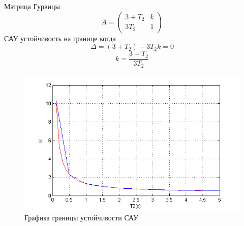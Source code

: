 \documentclass[a4paper, 11pt] {article}
\begin{document}
Матрица Гурвицы %
\[A = \left( {\begin{array}{*{20}{c}}
	{3 + {T_2}}&k\\
	{3{T_2}}&1
	\end{array}} \right)\]
САУ устойчивость на границе когда %
\[\Delta  = (3 + {T_2}) - 3{T_2}k = 0\]
\[k = \frac{{3 + {T_2}}}{{3{T_2}}}\]

\begin{figure}[ht]
	\centering
	\includegraphics[width=0.7\linewidth]{4}
	\caption{Графика границы устойчивости САУ}
	\label{fig:4}
\end{figure}
\end{document}
